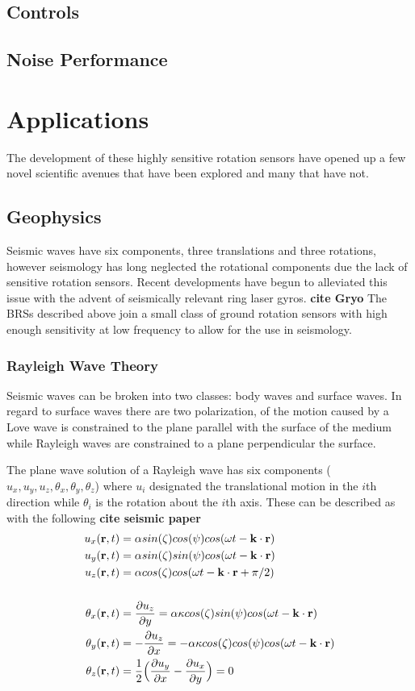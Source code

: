\documentclass [12pt, proquest]{uwthesis}[2019]
\begin{document}
\section{Controls}
\section{Noise Performance}

\chapter{Applications}
\quad The development of these highly sensitive rotation sensors have opened up a few novel scientific avenues that have been explored and many that have not.

\section{Geophysics}
Seismic waves have six components, three translations and three rotations, however seismology has long neglected the rotational components due the lack of sensitive rotation sensors. Recent developments have begun to alleviated this issue with the advent of seismically relevant ring laser gyros. \textbf{cite Gryo} The BRSs described above join a small class of ground rotation sensors with high enough sensitivity at low frequency to allow for the use in seismology.
\subsection{Rayleigh Wave Theory}

Seismic waves can be broken into two classes: body waves and surface waves. In regard to surface waves there are two polarization, of the motion caused by a Love wave is constrained to the plane parallel with the surface of the medium while Rayleigh waves are constrained to a plane perpendicular the surface. 

The plane wave solution of a Rayleigh wave has six components ($u_x, u_y, u_z, \theta_x, \theta_y, \theta_z$) where $u_i$ designated the translational motion in the $i$th direction while $\theta_i$ is the rotation about the $i$th axis.
These can be described as with the following \textbf{cite seismic paper}
\begin{align}
u_x({\bf r} ,t)&=\alpha sin(\zeta) cos(\psi) cos(\omega t-{\bf k}\cdot{\bf r})\\
u_y({\bf r} ,t)&=\alpha sin(\zeta) sin(\psi) cos(\omega t-{\bf k}\cdot{\bf r})\\
u_z({\bf r} ,t)&=\alpha cos(\zeta) cos(\omega t-{\bf k}\cdot{\bf r}+\pi/2)\label{ZEq}\\
\notag \\
\theta_x({\bf r} ,t)&=\frac{\partial u_z}{\partial y}=\alpha \kappa cos(\zeta) sin(\psi) cos(\omega t-{\bf k}\cdot{\bf r})\label{TiltXEq}\\
\theta_y({\bf r} ,t)&=-\frac{\partial u_z}{\partial x}=-\alpha \kappa cos(\zeta) cos(\psi) cos(\omega t-{\bf k}\cdot{\bf r})\\
\theta_z({\bf r} ,t)&=\frac{1}{2}\Big(\frac{\partial u_y}{\partial x}-\frac{\partial u_x}{\partial y}\Big)=0
\end{align}
\end{document}
